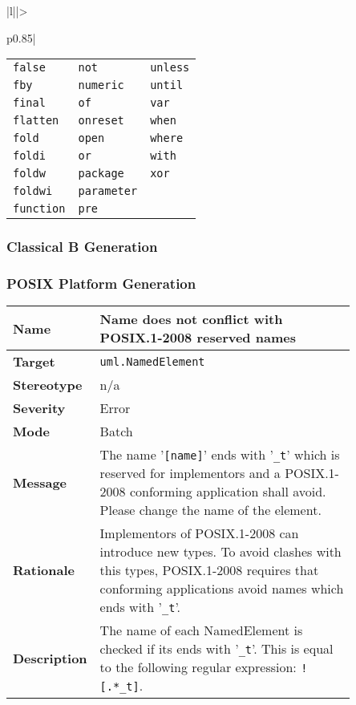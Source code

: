 \documentclass{template/openetcs_article}
\begin{document}
\begin{longtable}{|l||>{\raggedright}p{0.85\linewidth}|}
\begin{tabular}{l l l}
                            \texttt{false}     & \texttt{not}       & \texttt{unless}     \\
                            \texttt{fby}       & \texttt{numeric}   & \texttt{until}      \\
                            \texttt{final}     & \texttt{of}        & \texttt{var}        \\
                            \texttt{flatten}   & \texttt{onreset}   & \texttt{when}       \\
                            \texttt{fold}      & \texttt{open}      & \texttt{where}      \\
                            \texttt{foldi}     & \texttt{or}        & \texttt{with}       \\
                            \texttt{foldw}     & \texttt{package}   & \texttt{xor}        \\
                            \texttt{foldwi}    & \texttt{parameter}                       \\
                            \texttt{function}  & \texttt{pre}                             \\
                          \end{tabular}\tabularnewline \hline
\end{longtable}



\subsubsection{Classical B Generation}

\subsubsection{POSIX Platform Generation}

\begin{longtable}{|l||>{\raggedright}p{0.85\linewidth}|}
  \hline
  \textbf{Name}        &  Name does not conflict with POSIX.1-2008 reserved names \tabularnewline \hline
  \textbf{Target}      &  \texttt{uml.NamedElement} \tabularnewline \hline
  \textbf{Stereotype}  &  n/a \tabularnewline \hline
  \textbf{Severity}    &  Error \tabularnewline \hline
  \textbf{Mode}        &  Batch \tabularnewline \hline
  \textbf{Message}     &  The name '\texttt{[name]}' ends with '\texttt{\_t}' which is reserved for
                          implementors and a POSIX.1-2008 conforming application shall avoid. 
                          Please change the name of the element. \tabularnewline \hline
  \textbf{Rationale}   &  Implementors of POSIX.1-2008 can introduce new types. To avoid clashes with this types,
                          POSIX.1-2008 requires that conforming applications avoid names which 
                          ends with '\texttt{\_t}'. \tabularnewline \hline
  \textbf{Description} &  The name of each NamedElement is checked if its ends with '\texttt{\_t}'. This is equal to 
                          the following regular expression: \texttt{![.*\_t]}. \tabularnewline \hline
\end{longtable}



% 
% 

\end{document}
